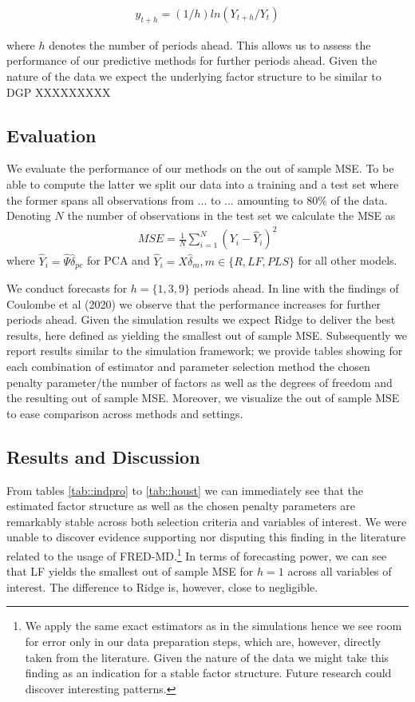 \begin{align}
	y_{t+h} = (1/h) ln(Y_{t+h}/Y_t)
\end{align}

where $h$ denotes the number of periods ahead. This allows us to assess the performance of our predictive methods for further periods ahead.
Given the nature of the data we expect the underlying factor structure to be similar to DGP XXXXXXXXX 

\subsection{Evaluation}
We evaluate the performance of our methods on the out of sample MSE. To be able to compute the latter we split our data into a training and a test set where the former spans all observations from ... to ... amounting to 80\% of the data. Denoting $N$ the number of observations in the test set we calculate the MSE as
\begin{align}
	    MSE = \frac{1}{N} \sum_{i=1}^N (Y_i - \widehat{Y}_i)^2
\end{align}
where $\widehat{Y}_i = \widehat{\Psi} \widehat{\delta}_{pc}$ for PCA and $\widehat{Y}_i = X \widehat{\delta}_{m}, m \in \{R, LF, PLS\}$ for all other models. 

We conduct forecasts for $h = \{1, 3, 9\}$ periods ahead. In line with the findings of Coulombe et al (2020) we observe that the performance increases for further periods ahead. Given the simulation results we expect Ridge to deliver the best results, here defined as yielding the smallest out of sample MSE. Subsequently we report results similar to the simulation framework; we provide tables showing for each combination of estimator and parameter selection method the chosen penalty parameter/the number of factors as well as the degrees of freedom and the resulting out of sample MSE. Moreover, we visualize the out of sample MSE to ease comparison across methods and settings.

\subsection{Results and Discussion}
From tables \ref{tab::indpro} to \ref{tab::houst} we can immediately see that the estimated factor structure as well as the chosen penalty parameters are remarkably stable across both selection criteria and variables of interest. We were unable to discover evidence supporting nor disputing this finding in the literature related to the usage of FRED-MD.\footnote{We apply the same exact estimators as in the simulations hence we see room for error only in our data preparation steps, which are, however, directly taken from the literature. Given the nature of the data we might take this finding as an indication for a stable factor structure. Future research could discover interesting patterns.}
In terms of forecasting power, we can see that LF yields the smallest out of sample MSE for $h=1$ across all variables of interest. The difference to Ridge is, however, close to negligible. 

